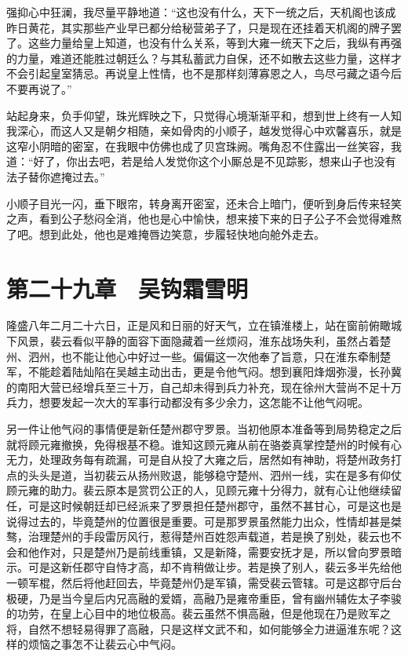 强抑心中狂澜，我尽量平静地道：“这也没有什么，天下一统之后，天机阁也该成昨日黄花，其实那些产业早已都分给秘营弟子了，只是现在还挂着天机阁的牌子罢了。这些力量给皇上知道，也没有什么关系，等到大雍一统天下之后，我纵有再强的力量，难道还能胜过朝廷么？与其私蓄武力自保，还不如散去这些力量，这样才不会引起皇室猜忌。再说皇上性情，也不是那样刻薄寡恩之人，鸟尽弓藏之语今后不要再说了。”

站起身来，负手仰望，珠光辉映之下，只觉得心境渐渐平和，想到世上终有一人知我深心，而这人又是朝夕相随，亲如骨肉的小顺子，越发觉得心中欢馨喜乐，就是这窄小阴暗的密室，在我眼中仿佛也成了贝宫珠阙。嘴角忍不住露出一丝笑容，我道：“好了，你出去吧，若是给人发觉你这个小厮总是不见踪影，想来山子也没有法子替你遮掩过去。”

小顺子目光一闪，垂下眼帘，转身离开密室，还未合上暗门，便听到身后传来轻笑之声，看到公子愁闷全消，他也是心中愉快，想来接下来的日子公子不会觉得难熬了吧。想到此处，他也是难掩唇边笑意，步履轻快地向舱外走去。

\chapter{第二十九章　吴钩霜雪明}

隆盛八年二月二十六日，正是风和日丽的好天气，立在镇淮楼上，站在窗前俯瞰城下风景，裴云看似平静的面容下面隐藏着一丝烦闷，淮东战场失利，虽然占着楚州、泗州，也不能让他心中好过一些。偏偏这一次他奉了旨意，只在淮东牵制楚军，不能趁着陆灿陷在吴越主动出击，更是令他气闷。想到襄阳烽烟弥漫，长孙冀的南阳大营已经增兵至三十万，自己却未得到兵力补充，现在徐州大营尚不足十万兵力，想要发起一次大的军事行动都没有多少余力，这怎能不让他气闷呢。

另一件让他气闷的事情便是新任楚州郡守罗景。当初他原本准备等到局势稳定之后就将顾元雍撤换，免得根基不稳。谁知这顾元雍从前在骆娄真掌控楚州的时候有心无力，处理政务每有疏漏，可是自从投了大雍之后，居然如有神助，将楚州政务打点的头头是道，当初裴云从扬州败退，能够稳守楚州、泗州一线，实在是多有仰仗顾元雍的助力。裴云原本是赏罚公正的人，见顾元雍十分得力，就有心让他继续留任，可是这时候朝廷却已经派来了罗景担任楚州郡守，虽然不甚甘心，可是这也是说得过去的，毕竟楚州的位置很是重要。可是那罗景虽然能力出众，性情却甚是桀骜，治理楚州的手段雷厉风行，惹得楚州百姓怨声载道，若是换了别处，裴云也不会和他作对，只是楚州乃是前线重镇，又是新降，需要安抚才是，所以曾向罗景暗示。可是这新任郡守自恃才高，却不肯稍做让步。若是换了别人，裴云多半先给他一顿军棍，然后将他赶回去，毕竟楚州仍是军镇，需受裴云管辖。可是这郡守后台极硬，乃是当今皇后内兄高融的爱婿，高融乃是雍帝重臣，曾有幽州辅佐太子李骏的功劳，在皇上心目中的地位极高。裴云虽然不惧高融，但是他现在乃是败军之将，自然不想轻易得罪了高融，只是这样文武不和，如何能够全力进逼淮东呢？这样的烦恼之事怎不让裴云心中气闷。

